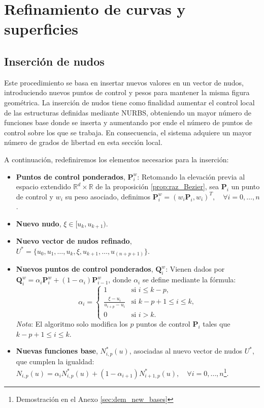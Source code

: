 \documentclass[11pt]{book}
\theoremstyle{plain} %
\theoremstyle{definition} %
\theoremstyle{definition} %
\begin{document}
\vspace{-1cm}

\section{Refinamiento de curvas y superficies}
\subsection{Inserción de nudos}
Este procedimiento se basa en insertar nuevos valores en un vector de nudos, introduciendo nuevos puntos de control y pesos para mantener la misma figura geométrica.
La inserción de nudos tiene como finalidad aumentar el control local de las estructuras definidas mediante NURBS, obteniendo un mayor número de funciones base donde se inserta y aumentando por ende el número de puntos de control sobre los que se trabaja.
En consecuencia, el sistema adquiere un mayor número de grados de libertad en esta sección local. 

A continuación, redefiniremos los elementos necesarios para la inserción:
    \begin{itemize}
        \item \textbf{Puntos de control ponderados}, $\mathbf{P}_i^w$: Retomando la elevación previa al espacio extendido $\mathbb{R}^d \times \mathbb{R}$ de la proposición \ref{prop:raz_Bezier}, sea $\mathbf{P}_i$ un punto de control y $w_i$ su peso asociado, definimos $\mathbf{P}_i^w = (w_i\mathbf{P}_i, w_i)^T, \quad \forall i = 0, \dots , n$.
        \item \textbf{Nuevo nudo}, $\xi \in [u_k, u_{k+1})$.
        \item \textbf{Nuevo vector de nudos refinado}, $U^*=\{u_0,u_1, \dots , u_k, \xi, u_{k+1}, \dots, u_{(n+p+1)}\}$.
        \item \textbf{Nuevos puntos de control ponderados}, $\mathbf{Q}_i^w$: Vienen dados por $\mathbf{Q}_{i}^{w} = \alpha_i \mathbf{P}_{i}^{w} + (1 - \alpha_i) \mathbf{P}_{i-1}^{w}$, donde $\alpha_i$ se define mediante la fórmula:
                $$\alpha_i = \begin{cases} 1 & \text{si } i \le k-p, \\ \frac{\xi - u_i}{u_{i+p} - u_i} & \text{si } k-p+1 \le i \le k, \\ 0 & \text{si } i > k. \end{cases}$$
        \textit{Nota}: El algoritmo solo modifica los $p$ puntos de control $\mathbf{P}_i$ tales que $k-p+1 \le i \le k$.
        \item \textbf{Nuevas funciones base}, $N_{i,p}^*(u)$, asociadas al nuevo vector de nudos $U^*$, que cumplen la igualdad: $N_{i,p}(u) = \alpha_{i} N_{i,p}^*(u) + (1 - \alpha_{i+1}) N_{i+1,p}^*(u), \quad \forall i = 0, \dots , n$\footnote{Demostración en el Anexo \ref{sec:dem_new_bases}}.
    \end{itemize}
\end{document}
